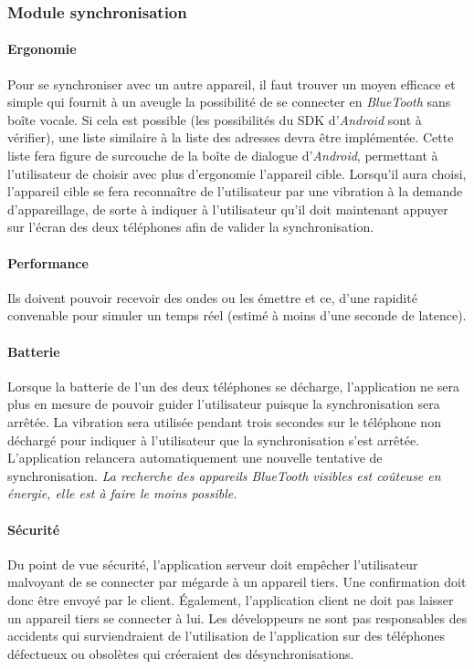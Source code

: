 {\subsubsection{Module synchronisation}

\paragraph{Ergonomie}
Pour se synchroniser avec un autre appareil, il faut trouver un moyen efficace et simple qui fournit à un aveugle la possibilité de se connecter en \textit{BlueTooth} sans boîte vocale. Si cela est possible (les possibilités du SDK d'\textit{Android} sont à vérifier), une liste similaire à la liste des adresses devra être implémentée. Cette liste fera figure de surcouche de la boîte de dialogue d'\textit{Android}, permettant à l'utilisateur de choisir avec plus d'ergonomie l'appareil cible. Lorsqu'il aura choisi, l'appareil cible se fera reconnaître de l'utilisateur par une vibration à la demande d'appareillage, de sorte à indiquer à l'utilisateur qu'il doit maintenant appuyer sur l'écran des deux téléphones afin de valider la synchronisation.

\paragraph{Performance} Ils doivent pouvoir recevoir des ondes ou les émettre et ce, d'une rapidité convenable pour simuler un temps réel (estimé à moins d'une seconde de latence).

\paragraph{Batterie} Lorsque la batterie de l'un des deux téléphones se décharge, l'application ne sera plus en mesure de pouvoir guider l'utilisateur puisque la synchronisation sera arrêtée. La vibration sera utilisée pendant trois secondes sur le téléphone non déchargé pour indiquer à l'utilisateur que la synchronisation s'est arrêtée. L'application relancera automatiquement une nouvelle tentative de synchronisation. \emph{La recherche des appareils \textit{BlueTooth} visibles est coûteuse en énergie, elle est à faire le moins possible.}

\paragraph{Sécurité} Du point de vue sécurité, l'application serveur doit empêcher l'utilisateur malvoyant de se connecter par mégarde à un appareil tiers. Une confirmation doit donc être envoyé par le client. Également, l'application client ne doit pas laisser un appareil tiers se connecter à lui.
Les développeurs ne sont pas responsables des accidents qui surviendraient de l'utilisation de l'application sur des téléphones défectueux ou obsolètes qui créeraient des désynchronisations.

}
